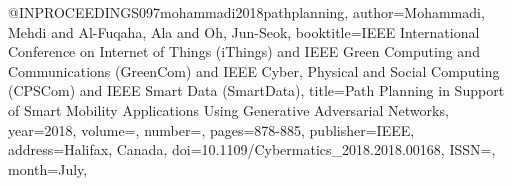 @INPROCEEDINGS{097mohammadi2018pathplanning,
author={Mohammadi, Mehdi and Al-Fuqaha, Ala and Oh, Jun-Seok},
booktitle={IEEE International Conference on Internet of Things (iThings) and IEEE Green Computing and Communications (GreenCom) and IEEE Cyber, Physical and Social Computing (CPSCom) and IEEE Smart Data (SmartData)}, 
title={Path Planning in Support of Smart Mobility Applications Using Generative Adversarial Networks}, 
year={2018},
volume={},
number={},
pages={878-885},
publisher={IEEE},
address={Halifax, Canada},
doi={10.1109/Cybermatics_2018.2018.00168},
ISSN={},
month={July},}